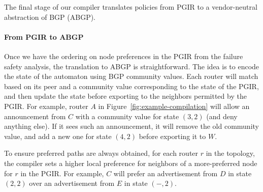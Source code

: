 \documentclass{sig-alternate-10pt}
\newcommand{\para}[1]{\paragraph*{\textbf{#1}}}
\newcommand{\KW}[1]{\texttt{\small\bfseries{#1}}}
\begin{document}
\newcommand{\highlight}[1]{%
  \colorbox{red!50}{$\displaystyle#1$}}
\newcommand{\Router}[1]{\KW{Router} #1:}
\newcommand{\REGEX}[1]{\texttt{regex}(#1)}
\newcommand{\PEER}{\texttt{peer}}
\newcommand{\COMM}{\texttt{comm}}
\newcommand{\MED}{\texttt{MED}}
\newcommand{\Arrow}{\ensuremath{\leftarrow}}




The final stage of our compiler translates policies from PGIR to a vendor-neutral abstraction of BGP (ABGP).

\para{From PGIR to ABGP}

Once we have the ordering on node preferences in the PGIR from the failure safety analysis, the translation to ABGP is straightforward. The idea is to encode the state of the automaton using BGP community values. Each router will match based on its peer and a community value corresponding to the state of the PGIR, and then update the state before exporting to the neighbors permitted by the PGIR. For example, router $A$ in Figure~\ref{fig:example-compilation} will allow an announcement from $C$ with a community value for state $(3,2)$ (and deny anything else). If it sees such an announcement, it will remove the old community value, and add a new one for state $(4,2)$ before exporting it to $W$.

To ensure preferred paths are always obtained, for each router $r$ in the topology, the compiler sets a higher local preference for neighbors of a more-preferred node for $r$ in the PGIR. For example, $C$ will prefer an advertisement from $D$ in state $(2,2)$ over an advertisement from $E$ in state $(-,2)$.
\end{document}
